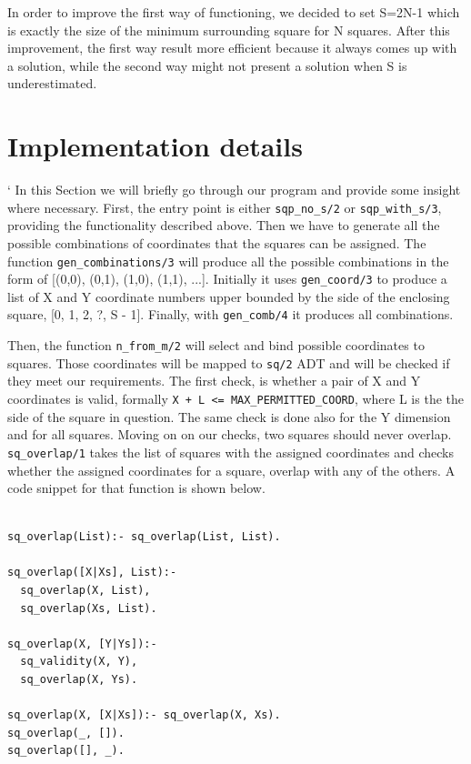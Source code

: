 \documentclass{article}
\begin{document}
In order to improve the first way of functioning, we decided to set S=2N-1 which is exactly the size of the minimum surrounding square for N squares. After this improvement, the first way result more efficient because it always comes up with a solution, while the second way might not present a solution when S is underestimated.

\section{Implementation details}
`
In this Section we will briefly go through our program and provide some insight where necessary. First, the entry point is either \texttt{sqp\_no\_s/2} or \texttt{sqp\_with\_s/3}, providing the functionality described above. Then we have to generate all the possible combinations of coordinates that the squares can be assigned. The function \texttt{gen\_combinations/3} will produce all the possible combinations in the form of [(0,0), (0,1), (1,0), (1,1), ...]. Initially it uses \texttt{gen\_coord/3} to produce a list of  X and Y coordinate numbers upper bounded by the side of the enclosing square, [0, 1, 2, ?, S - 1]. Finally, with \texttt{gen\_comb/4} it produces all combinations.

Then, the function \texttt{n\_from\_m/2} will select and bind possible coordinates to squares. Those coordinates will be mapped to \texttt{sq/2} ADT and will be checked if they meet our requirements. The first check, is whether a pair of X and Y coordinates is valid, formally \texttt{X + L <= MAX\_PERMITTED\_COORD}, where L is the the side of the square in question. The same check is done also for the Y dimension and for all squares. Moving on on our checks, two squares should never overlap. \texttt{sq\_overlap/1} takes the list of squares with the assigned coordinates and checks whether the assigned coordinates for a square, overlap with any of the others. A code snippet for that function is shown below.

\begin{verbatim}

sq_overlap(List):- sq_overlap(List, List).

sq_overlap([X|Xs], List):-
  sq_overlap(X, List),
  sq_overlap(Xs, List).

sq_overlap(X, [Y|Ys]):-
  sq_validity(X, Y),
  sq_overlap(X, Ys).

sq_overlap(X, [X|Xs]):- sq_overlap(X, Xs).
sq_overlap(_, []).
sq_overlap([], _).
\end{verbatim}
\end{document}
